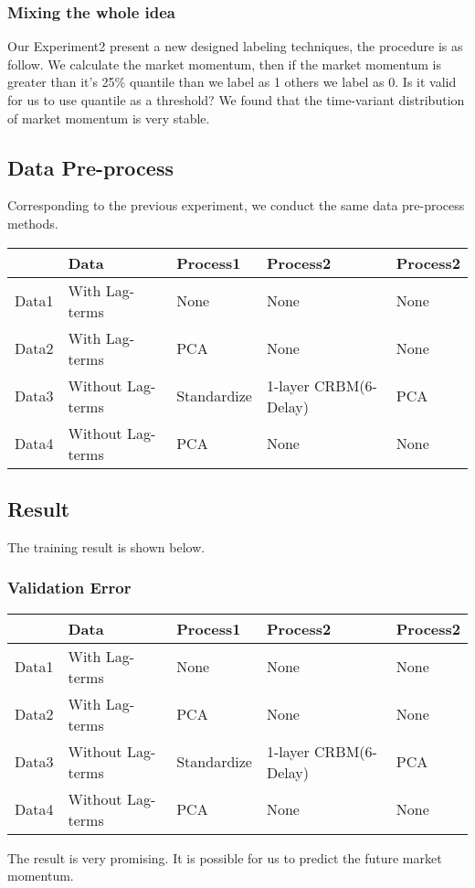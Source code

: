 {\subsubsection{Mixing the whole idea}
    Our Experiment2 present a new designed labeling techniques, the procedure is as follow. We calculate the market momentum, then if the market momentum is greater than it's 25\% quantile  than we label as 1 others we label as 0.
    Is it valid for us to use quantile as a threshold? We found that the time-variant distribution of market momentum is very stable.

\subsection{Data Pre-process}
    Corresponding to the previous experiment, we conduct the same data pre-process methods.  
    
\begin{table}[h]
\centering
\begin{tabular}{|l|l|l|l|l|}
\hline
      & Data              & Process1    & Process2      & Process2 \\ \hline
Data1 & With Lag-terms    & None        & None          & None     \\ \hline
Data2 & With Lag-terms    & PCA         & None          & None     \\ \hline
Data3 & Without Lag-terms & Standardize & 1-layer CRBM(6-Delay)  & PCA      \\ \hline
Data4 & Without Lag-terms & PCA         & None          & None     \\ \hline
\end{tabular}
\end{table}



\subsection{Result}

The training result is shown below.
\subsubsection{Validation Error}

\begin{table}[h]
\centering
\begin{tabular}{|l|l|l|l|l|}
\hline
      & Data              & Process1    & Process2      & Process2 \\ \hline
Data1 & With Lag-terms    & None        & None          & None     \\ \hline
Data2 & With Lag-terms    & PCA         & None          & None     \\ \hline
Data3 & Without Lag-terms & Standardize & 1-layer CRBM(6-Delay)  & PCA      \\ \hline
Data4 & Without Lag-terms & PCA         & None          & None     \\ \hline
\end{tabular}
\end{table}
    The result is very promising. It is possible for us to predict the future market momentum. 

}
